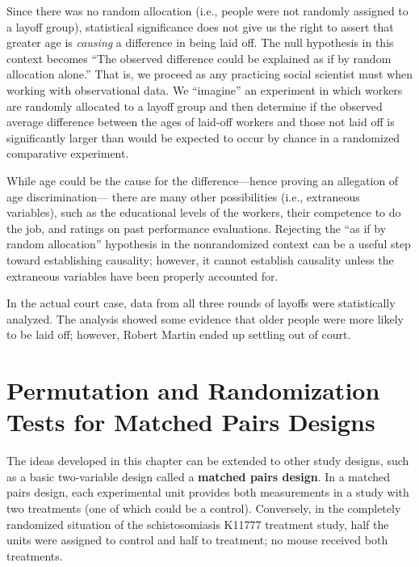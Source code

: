 \documentclass[
]{report}
\begin{document}
Since there was no random allocation (i.e., people were not randomly assigned to a layoff group), statistical significance does not give us the right to assert that greater age is \emph{causing} a difference in being laid off. The null hypothesis in this context becomes ``The observed difference could be explained as if by random allocation alone.'' That is, we proceed as any practicing social scientist must when working with observational data. We ``imagine'' an experiment in which workers are randomly allocated to a layoff group and then determine if the observed average difference between the ages of laid-off workers and those not laid off is significantly larger than would be expected to occur by chance in a randomized comparative experiment.

While age could be the cause for the difference---hence proving an allegation of age discrimination--- there are many other possibilities (i.e., extraneous variables), such as the educational levels of the workers, their competence to do the job, and ratings on past performance evaluations. Rejecting the ``as if by random allocation'' hypothesis in the nonrandomized context can be a useful step toward establishing causality; however, it cannot establish causality unless the extraneous variables have been properly accounted for.

In the actual court case, data from all three rounds of layoffs were statistically analyzed. The analysis showed some evidence that older people were more likely to be laid off; however, Robert Martin ended up settling out of court.

\hypertarget{permutation-and-randomization-tests-for-matched-pairs-designs}{%
\section{\texorpdfstring{\textbf{Permutation and Randomization Tests for Matched Pairs Designs}}{Permutation and Randomization Tests for Matched Pairs Designs}}\label{permutation-and-randomization-tests-for-matched-pairs-designs}}

The ideas developed in this chapter can be extended to other study designs, such as a basic two-variable design called a \textbf{matched pairs design}. In a matched pairs design, each experimental unit provides both measurements in a study with two treatments (one of which could be a control). Conversely, in the completely randomized situation of the schistosomiasis K11777 treatment study, half the units were assigned to control and half to treatment; no mouse received both treatments.
\end{document}
